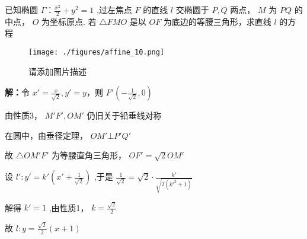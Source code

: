 \begin{example}{}
已知椭圆 $\displaystyle{\Gamma：\frac{x^2}{2}+y^2=1}$ ,过左焦点 $\displaystyle{F}$ 的直线 $\displaystyle{l}$ 交椭圆于 $\displaystyle{P,Q}$ 两点， $\displaystyle{M}$ 为 $\displaystyle{PQ}$ 的中点， $\displaystyle{O}$ 为坐标原点. 若 $\displaystyle{\triangle FMO}$ 是以 $\displaystyle{OF}$ 为底边的等腰三角形，求直线 $\displaystyle{l}$  的方程
\begin{figure}[ht]
\centering
\texttt{[image: ./figures/affine\_10.png]}
\caption{请添加图片描述} \label{affine_fig10}
\end{figure}
\textbf{解：}令 $\displaystyle{x'=\frac{x}{\sqrt{2}},y'=y}$，则 $\displaystyle{F'(-\frac{1}{\sqrt{2}},0)}$

由性质3， $\displaystyle{M'F',OM'}$ 仍旧关于铅垂线对称

在圆中，由垂径定理， $\displaystyle{OM'\bot P'Q'}$

故 $\displaystyle{\triangle OM'F'}$ 为等腰直角三角形， $\displaystyle{OF'=\sqrt{2} OM'}$

设 $\displaystyle{l':y'=k'\left(x'+\frac{1}{\sqrt{2}}\right)}$ ,于是 $\displaystyle{\frac{1}{\sqrt{2}}=\sqrt{2}\cdot \frac{k'}{\sqrt{2(k'^2+1)}}}$

解得 $\displaystyle{k'=1}$ ,由性质1， $\displaystyle{k=\frac{\sqrt{2}}{2}}$

故 $\displaystyle{l:y=\frac{\sqrt{2}}{2}(x+1)}$ 
\end{example}

